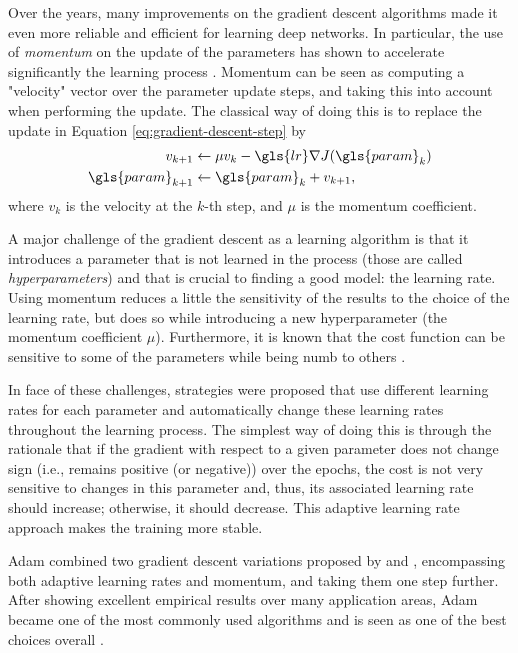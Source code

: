 Over the years, many improvements on the gradient descent algorithms made it even more reliable and efficient for learning deep networks.
In particular, the use of \textit{momentum} on the update of the parameters has shown to accelerate significantly the learning process \cite{sutskever_importance_2013}.
Momentum can be seen as computing a "velocity" vector over the parameter update steps, and taking this into account when performing the update.
The classical way of doing this is to replace the update in Equation \eqref{eq:gradient-descent-step} by
\begin{align*}
    v_{k+1} &\gets \mu v_k - \gls{lr} \nabla J(\gls{param}_k) \\
    \gls{param}_{k+1} &\gets \gls{param}_k + v_{k+1}
,\end{align*}
where $v_k$ is the velocity at the $k$-th step, and $\mu$ is the momentum coefficient.

A major challenge of the gradient descent as a learning algorithm is that it introduces a parameter that is not learned in the process (those are called \emph{hyperparameters}) and that is crucial to finding a good model: the learning rate.
Using momentum reduces a little the sensitivity of the results to the choice of the learning rate, but does so while introducing a new hyperparameter (the momentum coefficient $\mu$).
Furthermore, it is known that the cost function can be sensitive to some of the parameters while being numb to others \cite{goodfellow_deep_2016}.

In face of these challenges, strategies were proposed that use different learning rates for each parameter and automatically change these learning rates throughout the learning process.
The simplest way of doing this is through the rationale that if the gradient with respect to a given parameter does not change sign (i.e., remains positive (or negative)) over the epochs, the cost is not very sensitive to changes in this parameter and, thus, its associated learning rate should increase; otherwise, it should decrease.
This adaptive learning rate approach makes the training more stable.

Adam \cite{kingma_adam_2015} combined two gradient descent variations proposed by \textcite{duchi_adaptive_2011} and \textcite{tieleman_lecture_2012}, encompassing both adaptive learning rates and momentum, and taking them one step further.
After showing excellent empirical results over many application areas, Adam became one of the most commonly used algorithms and is seen as one of the best choices overall \cite{ruder_overview_2017}.

